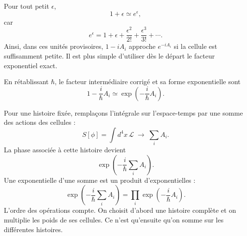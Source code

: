 Pour tout petit \(\epsilon\),
\begin{equation}
1+\epsilon\simeq e^\epsilon,
\end{equation}
car
\begin{equation}
e^\epsilon
=1+\epsilon+\frac{\epsilon^2}{2!}
+\frac{\epsilon^3}{3!}+\cdots.
\end{equation}
Ainsi, dans ces unités provisoires, \(1-iA_i\) approche \(e^{-iA_i}\) si la cellule est suffisamment petite. Il est plus simple d’utiliser dès le départ le facteur exponentiel exact.

\begin{classroomqa}
\end{classroomqa}

En rétablissant \(\hbar\), le facteur intermédiaire corrigé et sa forme exponentielle sont
\begin{equation}
1-\frac{i}{\hbar}A_i
\simeq
\exp\!\left(-\frac{i}{\hbar}A_i\right).
\end{equation}

Pour une histoire fixée, remplaçons l’intégrale sur l’espace-temps par une somme des actions des cellules :
\begin{equation}
S[\phi]
=\int d^4x\,\mathcal{L}
\;\longrightarrow\;
\sum_i A_i.
\end{equation}
La phase associée à cette histoire devient
\begin{equation}
\exp\!\left(-\frac{i}{\hbar}\sum_i A_i\right).
\end{equation}
Une exponentielle d’une somme est un produit d’exponentielles :
\begin{equation}
\exp\!\left(-\frac{i}{\hbar}\sum_i A_i\right)
=
\prod_i\exp\!\left(-\frac{i}{\hbar}A_i\right).
\end{equation}
L’ordre des opérations compte. On choisit d’abord une histoire complète et on multiplie les poids de ses cellules. Ce n’est qu’ensuite qu’on somme sur les différentes histoires.

